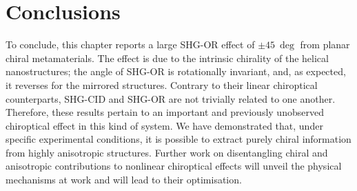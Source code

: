 \section{Conclusions}\label{sec:results:OAinPlanarNanohelices:conclusions}
To conclude, this chapter reports a large SHG-OR effect of $\pm \SI{45}{\deg}$ from planar chiral metamaterials. The effect is due to the intrinsic chirality of the helical nanostructures; the angle of SHG-OR is rotationally invariant, and, as expected, it reverses for the mirrored structures. Contrary to their linear chiroptical counterparts, SHG-CID and SHG-OR are not trivially related to one another. Therefore, these results pertain to an important and previously unobserved chiroptical effect in this kind of system. We have demonstrated that, under specific experimental conditions, it is possible to extract purely chiral information from highly anisotropic structures. Further work on disentangling chiral and anisotropic contributions to nonlinear chiroptical effects will unveil the physical mechanisms at work and will lead to their optimisation. 